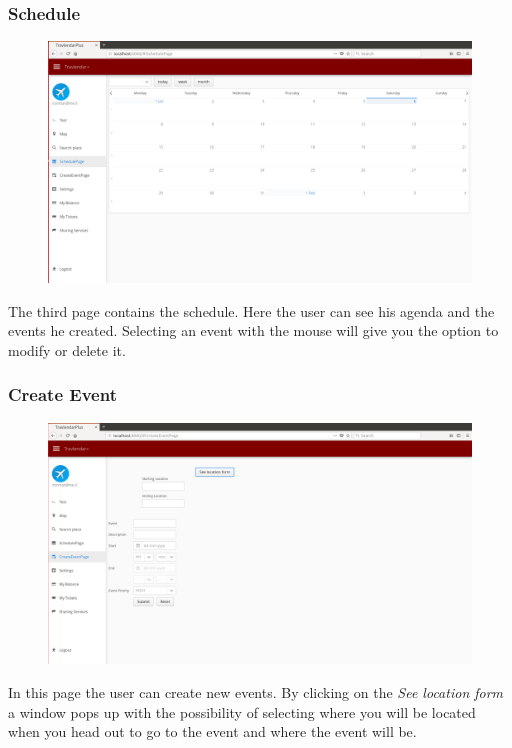 \documentclass{article}
\begin{document}
			\subsubsection{Schedule}
			\begin{figure}[H]
			\includegraphics[width=\linewidth]{Images/Pages/4-Schedule.png}
			\label{fig:Schedule}
			\end{figure}
		The third page contains the schedule. Here the user can see his agenda and the events he created. Selecting an event with the mouse will give you the option to modify or delete it.
			\subsubsection{Create Event}
			\begin{figure}[H]
			\includegraphics[width=\linewidth]{Images/Pages/5-Create_Event.png}
			\label{fig:Create_Event}
			\end{figure}
		In this page the user can create new events. By clicking on the \textit{See location form} a window pops up with the possibility of selecting where you will be located when you head out to go to the event and where the event will be.
\end{document}
